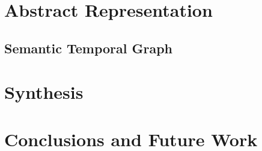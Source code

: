 \documentclass{article}
\begin{document}
\section{Abstract Representation}\label{subsec:representation}

\subsection{Semantic Temporal Graph} \label{subsec:st_graph}

\section{Synthesis} \label{subsec:synthesis}


\section{Conclusions and Future Work}


\end{document}
